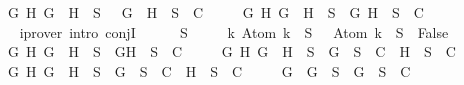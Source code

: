 \begin{isabellebody}
\ \ \ \ {\isasymand}\ {\isacharparenleft}{\isasymforall}G\ H{\isachardot}\ \isactrlbold {\isasymnot}{\isacharparenleft}G\ \isactrlbold {\isasymor}\ H{\isacharparenright}\ {\isasymin}\ S\ {\isasymlongrightarrow}\ {\isacharbraceleft}\isactrlbold {\isasymnot}\ G{\isacharcomma}\ \isactrlbold {\isasymnot}\ H{\isacharbraceright}\ {\isasymunion}\ S\ {\isasymin}\ C{\isacharparenright}\isanewline
\ \ \ \ {\isasymand}\ {\isacharparenleft}{\isasymforall}G\ H{\isachardot}\ \isactrlbold {\isasymnot}{\isacharparenleft}G\ \isactrlbold {\isasymrightarrow}\ H{\isacharparenright}\ {\isasymin}\ S\ {\isasymlongrightarrow}\ {\isacharbraceleft}G{\isacharcomma}\isactrlbold {\isasymnot}\ H{\isacharbraceright}\ {\isasymunion}\ S\ {\isasymin}\ C{\isacharparenright}{\isachardoublequoteclose}\isanewline
\ \ \ \ \isamarkupfalse%
\ {}\ {}\ {}\ {}\ \isamarkupfalse%
\ {\isacharparenleft}iprover\ intro{\isacharcolon}\ conjI{\isacharparenright}\isanewline
\ \ \isamarkupfalse%
\ {\isachardoublequoteopen}{\isacharparenleft}{\isasymbottom}\ {\isasymnotin}\ S\isanewline
\ \ \ \ {\isasymand}\ {\isacharparenleft}{\isasymforall}k{\isachardot}\ Atom\ k\ {\isasymin}\ S\ {\isasymlongrightarrow}\ \isactrlbold {\isasymnot}\ {\isacharparenleft}Atom\ k{\isacharparenright}\ {\isasymin}\ S\ {\isasymlongrightarrow}\ False{\isacharparenright}\isanewline
\ \ \ \ {\isasymand}\ {\isacharparenleft}{\isasymforall}G\ H{\isachardot}\ G\ \isactrlbold {\isasymand}\ H\ {\isasymin}\ S\ {\isasymlongrightarrow}\ {\isacharbraceleft}G{\isacharcomma}H{\isacharbraceright}\ {\isasymunion}\ S\ {\isasymin}\ C{\isacharparenright}\isanewline
\ \ \ \ {\isasymand}\ {\isacharparenleft}{\isasymforall}G\ H{\isachardot}\ G\ \isactrlbold {\isasymor}\ H\ {\isasymin}\ S\ {\isasymlongrightarrow}\ {\isacharbraceleft}G{\isacharbraceright}\ {\isasymunion}\ S\ {\isasymin}\ C\ {\isasymor}\ {\isacharbraceleft}H{\isacharbraceright}\ {\isasymunion}\ S\ {\isasymin}\ C{\isacharparenright}\isanewline
\ \ \ \ {\isasymand}\ {\isacharparenleft}{\isasymforall}G\ H{\isachardot}\ G\ \isactrlbold {\isasymrightarrow}\ H\ {\isasymin}\ S\ {\isasymlongrightarrow}\ {\isacharbraceleft}\isactrlbold {\isasymnot}G{\isacharbraceright}\ {\isasymunion}\ S\ {\isasymin}\ C\ {\isasymor}\ {\isacharbraceleft}H{\isacharbraceright}\ {\isasymunion}\ S\ {\isasymin}\ C{\isacharparenright}{\isacharparenright}\isanewline
\ \ \ \ {\isasymand}\ {\isacharparenleft}{\isacharparenleft}{\isasymforall}G{\isachardot}\ \isactrlbold {\isasymnot}\ {\isacharparenleft}\isactrlbold {\isasymnot}G{\isacharparenright}\ {\isasymin}\ S\ {\isasymlongrightarrow}\ {\isacharbraceleft}G{\isacharbraceright}\ {\isasymunion}\ S\ {\isasymin}\ C{\isacharparenright}\isanewline

\end{isabellebody}
